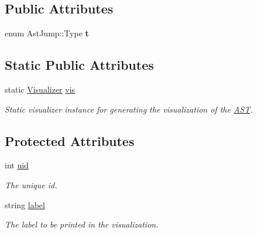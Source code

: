 \subsection*{Public Attributes}
\begin{DoxyCompactItemize}
\item 
\hypertarget{classAstJump_aea1a550743aa9b9a0e73de3d5489cdfd}{enum Ast\-Jump\-::\-Type {\bfseries t}}\label{classAstJump_aea1a550743aa9b9a0e73de3d5489cdfd}

\end{DoxyCompactItemize}
\subsection*{Static Public Attributes}
\begin{DoxyCompactItemize}
\item 
\hypertarget{classAST_aca9e6637209b31e03a09c0d42f29bdfa}{static \hyperlink{classVisualizer}{Visualizer} \hyperlink{classAST_aca9e6637209b31e03a09c0d42f29bdfa}{vis}}\label{classAST_aca9e6637209b31e03a09c0d42f29bdfa}

\begin{DoxyCompactList}\small\item\em Static visualizer instance for generating the visualization of the \hyperlink{classAST}{A\-S\-T}. \end{DoxyCompactList}\end{DoxyCompactItemize}
\subsection*{Protected Attributes}
\begin{DoxyCompactItemize}
\item 
\hypertarget{classAST_a847b778f1c3dd5a19de32de432ee6e15}{int \hyperlink{classAST_a847b778f1c3dd5a19de32de432ee6e15}{uid}}\label{classAST_a847b778f1c3dd5a19de32de432ee6e15}

\begin{DoxyCompactList}\small\item\em The unique id. \end{DoxyCompactList}\item 
\hypertarget{classAST_ab2e239ccc0688d2341724432ff5a1a31}{string \hyperlink{classAST_ab2e239ccc0688d2341724432ff5a1a31}{label}}\label{classAST_ab2e239ccc0688d2341724432ff5a1a31}

\begin{DoxyCompactList}\small\item\em The label to be printed in the visualization. \end{DoxyCompactList}\end{DoxyCompactItemize}
